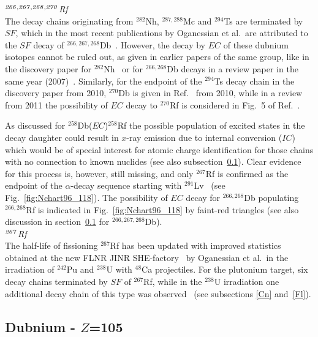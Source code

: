 {\it $^{\it266,267,268,270}$Rf}\\
The decay chains originating from $^{282}$Nh, $^{287,288}$Mc and $^{294}$Ts are terminated by $SF$, which in the most recent publications by Oganessian et al.~are attributed to the $SF$ decay of $^{266,267,268}$Db~\cite{Oganessian2017}. 
However, the decay by $EC$ of these dubnium isotopes cannot be ruled out, as given in earlier papers of the same group, like in the discovery paper for $^{282}$Nh~\cite{Oganessian2007b} or for $^{266,268}$Db decays in a review paper in the same year (2007)~\cite{Oganessian2007}. 
Similarly, for the endpoint of the $^{294}$Ts decay chain in the discovery paper from 2010, $^{270}$Db is given in Ref.~\cite{Oganessian2010} from 2010, while in a review from 2011 the possibility of $EC$ decay to $^{270}$Rf is considered in Fig.~5 of Ref.~\cite{Oganessian2011a}.

As discussed for $^{258}$Db($EC$)$^{258}$Rf the possible population of excited states in the decay daughter could result in $x$-ray emission due to internal conversion ($IC$) which would be of special interest for atomic charge identification for those chains with no connection to known nuclides (see also subsection~\ref{Db}).  
Clear evidence for this process is, however, still missing, and only $^{267}$Rf is confirmed as the endpoint of the $\alpha$-decay sequence starting with $^{291}$Lv~\cite{Oganessian2004a} (see Fig.~\ref{fig:Nchart96_118}). 
The possibility of $EC$ decay for $^{266,268}$Db populating $^{266,268}$Rf is indicated in Fig.~\ref{fig:Nchart96_118} by faint-red triangles (see also discussion in section~\ref{Db} for $^{266,267,268}$Db).\\

{\it $^{\it267}$Rf}\\
The half-life of fissioning $^{267}$Rf has been updated with improved statistics obtained at the new FLNR JINR SHE-factory~\cite{Oganessian2022c} by Oganessian et al.~in the irradiation of $^{242}$Pu and $^{238}$U with $^{48}$Ca projectiles. 
For the plutonium target, six decay chains terminated by $SF$ of $^{267}$Rf, while in the $^{238}$U irradiation one additional decay chain of this type was observed~\cite{Oganessian2022b} (see subsections \ref{Cn} and~\ref{Fl}).

\subsection{Dubnium - $Z$=105}\label{Db}



